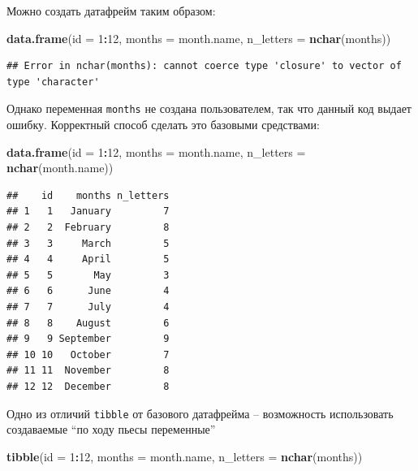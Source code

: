 \documentclass[]{book}
\newenvironment{Shaded}{\begin{snugshade}}{\end{snugshade}}
\newcommand{\DataTypeTok}[1]{\textcolor[rgb]{0.13,0.29,0.53}{#1}}
\newcommand{\DecValTok}[1]{\textcolor[rgb]{0.00,0.00,0.81}{#1}}
\newcommand{\KeywordTok}[1]{\textcolor[rgb]{0.13,0.29,0.53}{\textbf{#1}}}
\newcommand{\NormalTok}[1]{#1}
\newcommand{\OperatorTok}[1]{\textcolor[rgb]{0.81,0.36,0.00}{\textbf{#1}}}
\begin{document}
Можно создать датафрейм таким образом:

\begin{Shaded}
\begin{Highlighting}[]
\KeywordTok{data.frame}\NormalTok{(}\DataTypeTok{id =} \DecValTok{1}\OperatorTok{:}\DecValTok{12}\NormalTok{,}
           \DataTypeTok{months =}\NormalTok{ month.name,}
           \DataTypeTok{n_letters =} \KeywordTok{nchar}\NormalTok{(months))}
\end{Highlighting}
\end{Shaded}

\begin{verbatim}
## Error in nchar(months): cannot coerce type 'closure' to vector of type 'character'
\end{verbatim}

Однако переменная \texttt{months} не создана пользователем, так что данный код выдает ошибку. Корректный способ сделать это базовыми средствами:

\begin{Shaded}
\begin{Highlighting}[]
\KeywordTok{data.frame}\NormalTok{(}\DataTypeTok{id =} \DecValTok{1}\OperatorTok{:}\DecValTok{12}\NormalTok{,}
           \DataTypeTok{months =}\NormalTok{ month.name,}
           \DataTypeTok{n_letters =} \KeywordTok{nchar}\NormalTok{(month.name))}
\end{Highlighting}
\end{Shaded}

\begin{verbatim}
##    id    months n_letters
## 1   1   January         7
## 2   2  February         8
## 3   3     March         5
## 4   4     April         5
## 5   5       May         3
## 6   6      June         4
## 7   7      July         4
## 8   8    August         6
## 9   9 September         9
## 10 10   October         7
## 11 11  November         8
## 12 12  December         8
\end{verbatim}

Одно из отличий \texttt{tibble} от базового датафрейма -- возможность использовать создаваемые ``по ходу пьесы переменные''

\begin{Shaded}
\begin{Highlighting}[]
\KeywordTok{tibble}\NormalTok{(}\DataTypeTok{id =} \DecValTok{1}\OperatorTok{:}\DecValTok{12}\NormalTok{,}
       \DataTypeTok{months =}\NormalTok{ month.name,}
       \DataTypeTok{n_letters =} \KeywordTok{nchar}\NormalTok{(months))}
\end{Highlighting}
\end{Shaded}
\end{document}
